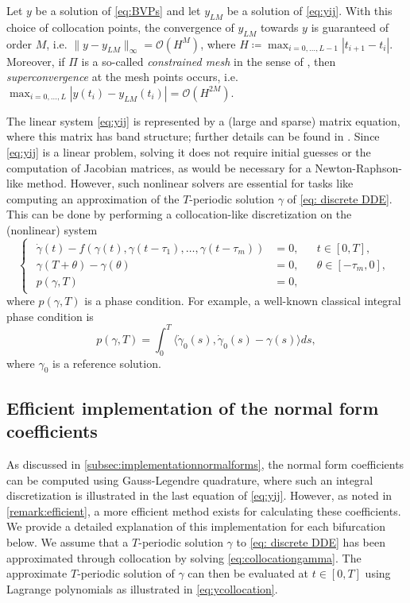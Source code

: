 \documentclass[english]{myarticle}
\begin{document}
\begin{sloppypar}
Let $y$ be a solution of \eqref{eq:BVPs} and let $y_{LM}$ be a solution of \eqref{eq:yij}. With this choice of collocation points, the convergence of $y_{LM}$ towards $y$ is guaranteed of order $M$, i.e. $\|y - y_{LM} \|_\infty = \mathcal{O}(H^{M})$, where $H \coloneqq \max_{i=0,\dots,L-1} |t_{i+1}-t_i|$. Moreover, if $\Pi$ is a so-called \emph{constrained mesh} in the sense of \cite[Section 4]{Engelborghs2001}, then \emph{superconvergence} at the mesh points occurs, i.e. $\max_{i=0,\dots,L}|y(t_i) - y_{LM}(t_i)| = \mathcal{O}(H^{2M})$. 

The linear system \eqref{eq:yij} is represented by a (large and sparse) matrix equation, where this matrix has band structure; further details can be found in \cite[Section 5.2]{Engelborghs2001}. Since \eqref{eq:yij} is a linear problem, solving it does not require initial guesses or the computation of Jacobian matrices, as would be necessary for a Newton-Raphson-like method. However, such nonlinear solvers are essential for tasks like computing an approximation of the $T$-periodic solution $\gamma$ of \eqref{eq: discrete DDE}. This can be done by performing a collocation-like discretization on the (nonlinear) system
\begin{equation} \label{eq:collocationgamma}
    \begin{cases}
        \begin{aligned}
            \dot{\gamma}(t) - f(\gamma(t),\gamma(t-\tau_1),\dots,\gamma(t-\tau_m)) &= 0, && t \in [0,T],\\
            \gamma(T + \theta) - \gamma(\theta) &= 0, && \theta \in [-\tau_m,0], \\
            p(\gamma,T)  &= 0,
        \end{aligned}
    \end{cases}
\end{equation}
where $p(\gamma,T)$ is a phase condition. For example, a well-known classical integral phase condition \cite{DOEDEL1991} is 
\begin{equation*}
    p(\gamma,T) = \int_0^T \langle \dot{\gamma}_0(s), \dot{\gamma}_0(s) - \gamma(s) \rangle ds,
\end{equation*}
where $\gamma_0$ is a reference solution.

\subsection{Efficient implementation of the normal form coefficients}
As discussed in \cref{subsec:implementationnormalforms}, the normal form coefficients can be computed using Gauss-Legendre quadrature, where such an integral discretization is illustrated in the last equation of \eqref{eq:yij}. However, as noted in \cref{remark:efficient}, a more efficient method exists for calculating these coefficients. We provide a detailed explanation of this implementation for each bifurcation below. We assume that a $T$-periodic solution $\gamma$ to \eqref{eq: discrete DDE} has been approximated through collocation by solving \eqref{eq:collocationgamma}. The approximate $T$-periodic solution of $\gamma$ can then be evaluated at $t \in [0,T]$ using Lagrange polynomials as illustrated in \eqref{eq:ycollocation}.


\end{sloppypar}
\end{document}

